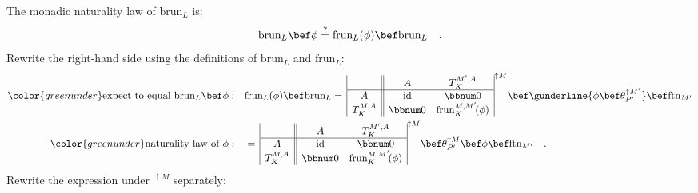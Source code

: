 The monadic naturality law of $\text{brun}_{L}$ is:
\[
\text{brun}_{L}\bef\phi\overset{?}{=}\text{frun}_{L}(\phi)\bef\text{brun}_{L}\quad.
\]
Rewrite the right-hand side using the definitions of $\text{brun}_{L}$
and $\text{frun}_{L}$:
\begin{align*}
{\color{greenunder}\text{expect to equal }\text{brun}_{L}\bef\phi:}\quad & \text{frun}_{L}(\phi)\bef\text{brun}_{L}=\,\begin{array}{|c||cc|}
 & A & T_{K}^{M^{\prime},A}\\
\hline A & \text{id} & \bbnum 0\\
T_{K}^{M,A} & \bbnum 0 & \text{frun}_{K}^{M,M^{\prime}}\!(\phi)
\end{array}^{\uparrow M}\bef\gunderline{\phi\bef\theta_{P^{\prime}}^{\uparrow M^{\prime}}}\bef\text{ftn}_{M^{\prime}}\\
{\color{greenunder}\text{naturality law of }\phi:}\quad & =\,\begin{array}{|c||cc|}
 & A & T_{K}^{M^{\prime},A}\\
\hline A & \text{id} & \bbnum 0\\
T_{K}^{M,A} & \bbnum 0 & \text{frun}_{K}^{M,M^{\prime}}\!(\phi)
\end{array}^{\uparrow M}\bef\theta_{P^{\prime}}^{\uparrow M}\bef\phi\bef\text{ftn}_{M^{\prime}}\quad.
\end{align*}
Rewrite the expression under $^{\uparrow M}$ separately:
